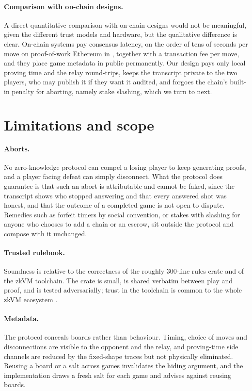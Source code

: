 \documentclass[11pt,a4paper]{article}
\begin{document}
\paragraph{Comparison with on-chain designs.} A direct quantitative comparison
with on-chain designs would not be meaningful, given the different trust models
and hardware, but the qualitative difference is clear. On-chain systems pay
consensus latency, on the order of tens of seconds per move on proof-of-work
Ethereum in \cite{mit6857}, together with a transaction fee per move, and they
place game metadata in public permanently. Our design pays only local proving
time and the relay round-trips, keeps the transcript private to the two
players, who may publish it if they want it audited, and forgoes the chain's
built-in penalty for aborting, namely stake slashing, which we turn to next.

\section{Limitations and scope}
\label{sec:limits}

\paragraph{Aborts.} No zero-knowledge protocol can compel a losing player to
keep generating proofs, and a player facing defeat can simply disconnect. What
the protocol does guarantee is that such an abort is attributable and cannot be
faked, since the transcript shows who stopped answering and that every answered
shot was honest, and that the outcome of a completed game is not open to
dispute. Remedies such as forfeit timers by social convention, or stakes with
slashing for anyone who chooses to add a chain or an escrow, sit outside the
protocol and compose with it unchanged.

\paragraph{Trusted rulebook.} Soundness is relative to the correctness of the
roughly 300-line rules crate and of the zkVM toolchain. The crate is small, is
shared verbatim between play and proof, and is tested adversarially; trust in
the toolchain is common to the whole zkVM ecosystem \cite{zkpsurvey}.

\paragraph{Metadata.} The protocol conceals boards rather than behaviour.
Timing, choice of moves and disconnections are visible to the opponent and the
relay, and proving-time side channels are reduced by the fixed-shape traces but
not physically eliminated. Reusing a board or a salt across games invalidates
the hiding argument, and the implementation draws a fresh salt for each game and
advises against reusing boards.
\end{document}
